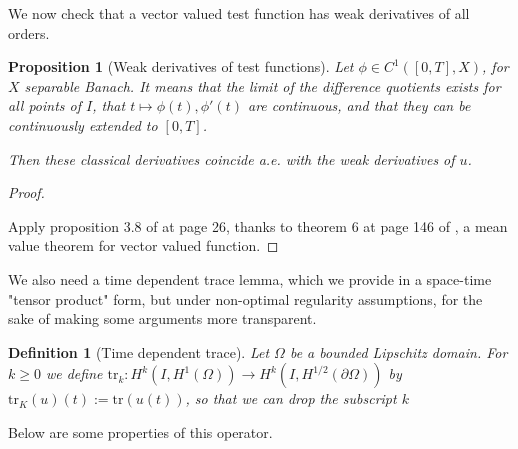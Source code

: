 \documentclass[english,a4paper,9pt,oneside]{scrbook}	%
\theoremstyle{break}
\newtheorem{defn}[equation]{Definition}
\newtheorem{prop}[equation]{Proposition}
\newenvironment{mproof}[1][\proofname]{%
  \begin{proof}[#1]$ $\par\nobreak\ignorespaces
}{%
  \end{proof}
}
\renewcommand*{\proofname}{Proof}
\theoremstyle{remark}
\newcommand{\tr}{\text{tr}}
\newcommand{\emb}{\hookrightarrow}
\begin{document}
\begin{appendices}
%
%
%

We now check that a vector valued test function has weak derivatives of all orders.

\begin{prop}[Weak derivatives of test functions]
\label{prop:weak_class}
Let $\phi \in C^1([0,T],X)$, for $X$ separable Banach. It means that the limit of the difference quotients exists for all points of $I$, that $t\mapsto \phi(t), \phi'(t)$ are continuous, and that they can be continuously extended to $[0,T]$.

Then these classical derivatives coincide a.e. with the weak derivatives of $u$.

\end{prop}
\begin{mproof}


Apply proposition 3.8 of \cite{kreuter} at page 26, thanks to theorem 6 at page 146 of \cite{mvt}, a mean value theorem for vector valued function.
\end{mproof}

We also need a time dependent trace lemma, which we provide in a space-time "tensor product" form, but under non-optimal regularity assumptions, for the sake of making some arguments more transparent.

\begin{defn}[Time dependent trace]
Let $\Omega$ be a bounded Lipschitz domain. For $k\geq 0$ we define $\tr_k: H^k(I,H^1(\Omega))\rightarrow H^k(I, H^{1/2} (\partial \Omega))$ by $\tr_K(u)(t):=\tr(u(t))$, so that we can drop the subscript $k$
\end{defn}

Below are some properties of this operator.


\end{appendices}
\end{document}
